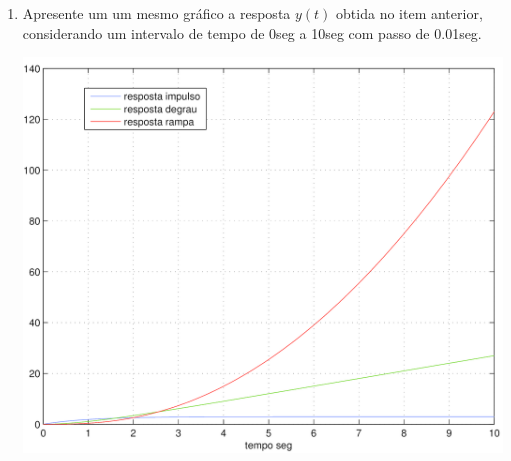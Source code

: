 \documentclass[a4paper, 10pt]{article}
\begin{document}
\begin{list}{\textbf{Questão .}}{
\setlength{\labelwidth}{-2mm} \setlength{\parsep}{0mm}
\setlength{\topsep}{0mm} \setlength{\leftmargin}{0mm}}
\begin{enumerate}
            Para a ultima resposta, a $\mathcal{L}$ da rampa unitária é $\mathcal{L}(r(t)) = \frac{1}{s^2}$, logo,

            $$
            Y(s) = \frac{3}{s(s+1)} \cdot \frac{1}{s^2} = \frac{3}{s^4 + s^3}
            $$

            Expandindo em frações parciais,

            $$
            Y(s) = \frac{3}{s^3} - \frac{3}{s^2} + \frac{3}{s} - \frac{3}{s+1}
            $$

            Aplicando $\mathcal{L}^{-1}$, encontra-se a resposta para a \textbf{rampa} ,

           \begin{equation}
            y(t) = \frac{3 t^2}{2} - 3 t + 3 - 3 e^{-t}
        \end{equation}

            
            
         \item 
             Apresente um um mesmo gráfico a resposta $y(t)$  obtida no item anterior, 
             considerando um intervalo de tempo de 0seg a 10seg com passo de 0.01seg.
 
             \begin{center}
                \includegraphics[scale=0.15]{fig2q.png}
             \end{center}



\end{enumerate}
\end{list}
\end{document}

